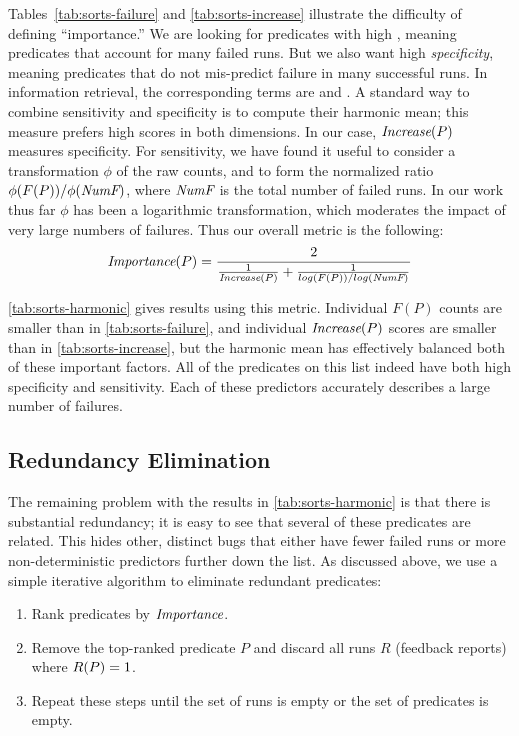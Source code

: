 Tables~\ref{tab:sorts-failure} and \ref{tab:sorts-increase} illustrate
the difficulty of defining ``importance.''  We are looking for
predicates with high , meaning predicates that
account for many failed runs.  But we also want high
\emph{specificity}, meaning predicates that do not mis-predict failure
in many successful runs.  In information retrieval, the corresponding
terms are  and .  A standard way to combine sensitivity
and specificity is to compute their harmonic mean; this measure
prefers high scores in both dimensions.  In our case, $\textit{Increase}(P)$
measures specificity.  For sensitivity, we have found it useful to
consider a transformation $\phi$ of the raw counts, and to form the
normalized ratio $\phi(F(P)) / \phi(\textit{NumF})$, where $\textit{NumF}$ is
the total number of failed runs.  In our work thus far $\phi$ has been
a logarithmic transformation, which moderates the impact of very large
numbers of failures.  Thus our overall metric is the following:
\[
\textit{Importance}(P) =
\frac{2}{
  \frac{1}{\textit{Increase}(P)}
  +
  \frac{1}{log(F(P)) / log(\textit{NumF})}}
\]

\autoref{tab:sorts-harmonic} gives results using this metric.
Individual $F(P)$ counts are smaller than in
\autoref{tab:sorts-failure}, and individual $\textit{Increase}(P)$ scores are
smaller than in \autoref{tab:sorts-increase}, but the harmonic mean
has effectively balanced both of these important factors.  All of the
predicates on this list indeed have both high specificity and
sensitivity.  Each of these predictors accurately describes a large
number of failures.

\subsection{Redundancy Elimination}
\label{sec:elimination}

The remaining problem with the results in \autoref{tab:sorts-harmonic}
is that there is substantial redundancy; it is easy to see that several of these
predicates are related.  This hides other, distinct bugs that either have
fewer failed runs or more non-deterministic predictors further down the
list.  As discussed above, we use a simple iterative algorithm to eliminate
redundant predicates:
\begin{enumerate}

\item Rank predicates by $\textit{Importance}$.

\item Remove the top-ranked predicate $P$ and discard all runs $R$
  (feedback reports) where $R(P) = 1$.

\item Repeat these steps until the set of runs is empty or the set of predicates is empty.
\end{enumerate}

